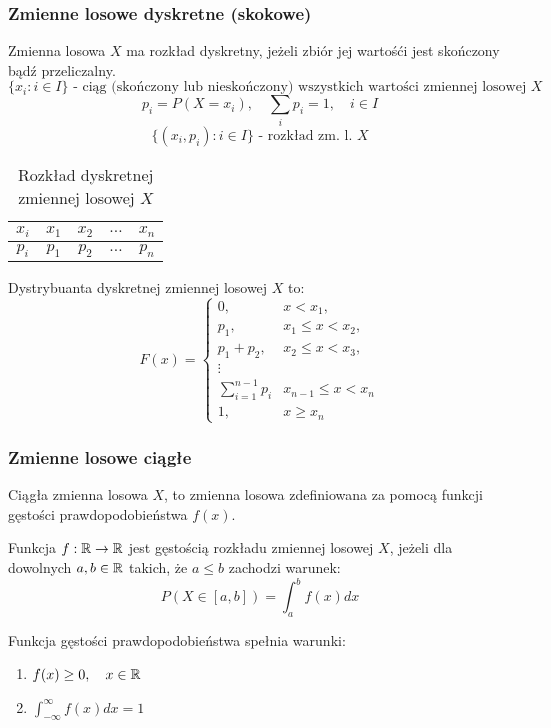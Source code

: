 \documentclass[../Matematyka.tex]{subfiles}
\begin{document}
\newpage
\subsubsection{Zmienne losowe dyskretne (skokowe)}
Zmienna losowa \(X\) ma rozkład dyskretny, jeżeli zbiór jej wartośći jest skończony bądź przeliczalny.
\[\{x_i : i \in I\} \text{ - ciąg (skończony lub nieskończony) wszystkich wartości zmiennej losowej } X\]
\[p_i = P(X = x_i), \quad \sum_ip_i=1, \quad i \in I\]
\[\{(x_i, p_i): i \in I\} \text{ - rozkład zm. l. } X\]

\begin{table}[H]
    \centering
    \caption{Rozkład dyskretnej zmiennej losowej \(X\)}
    \begin{tabular}{c||c|c|c|c}
        \(x_i\) & \(x_1\) & \(x_2\) & \(\ldots\) & \(x_n\) \\
        \hline
        \(p_i\) & \(p_1\) & \(p_2\) & \(\ldots\) & \(p_n\)
    \end{tabular}
\end{table}

Dystrybuanta dyskretnej zmiennej losowej \(X\) to:
\[
    F(x) =
    \begin{cases}
        0,                   & x < x_1,             \\
        p_1,                 & x_1 \leq x < x_2,    \\
        p_1 + p_2,           & x_2 \leq x < x_3,    \\
        \vdots                                      \\
        \sum_{i=1}^{n-1} p_i & x_{n-1} \leq x < x_n \\
        1,                   & x \geq x_n
    \end{cases}
\]

\subsubsection{Zmienne losowe ciągłe}
Ciągła zmienna losowa \(X\), to zmienna losowa zdefiniowana za pomocą funkcji gęstości prawdopodobieństwa \(f(x)\).

Funkcja \(f:\mathbb{R} \rightarrow \mathbb{R}\) jest gęstością rozkładu zmiennej losowej \(X\), jeżeli dla dowolnych \(a, b \in \mathbb{R}\) takich, że \(a \leq b\) zachodzi warunek:
\[P(X \in [a, b]) = \int_{a}^{b}\!f(x)dx\]

Funkcja gęstości prawdopodobieństwa spełnia warunki:
\begin{enumerate}[label=(\roman*)]
    \item \(f(x) \geq 0, \quad x \in \mathbb{R}\)
    \item \(\displaystyle\int_{-\infty}^{\infty}\!f(x)dx = 1\)
\end{enumerate}
\end{document}
